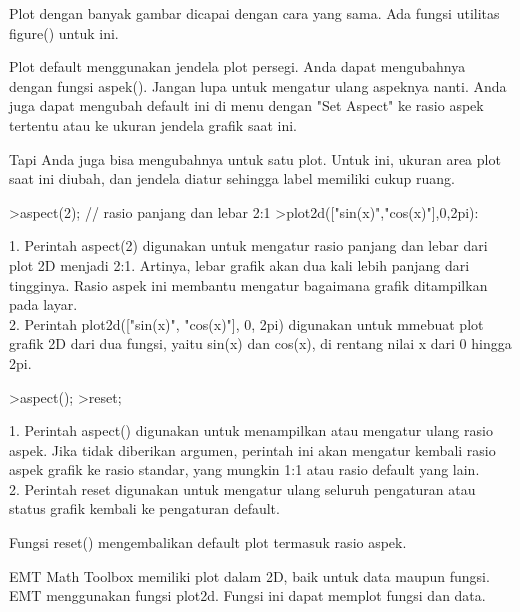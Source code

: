 \documentclass{article}
\begin{document}
\begin{eulernotebook}
\begin{eulercomment}
\begin{eulercomment}
\begin{eulercomment}
Plot dengan banyak gambar dicapai dengan cara yang sama. Ada fungsi
utilitas figure() untuk ini.

\end{eulercomment}
\begin{eulercomment}
Plot default menggunakan jendela plot persegi. Anda dapat mengubahnya
dengan fungsi aspek(). Jangan lupa untuk mengatur ulang aspeknya
nanti. Anda juga dapat mengubah default ini di menu dengan "Set
Aspect" ke rasio aspek tertentu atau ke ukuran jendela grafik saat
ini.

Tapi Anda juga bisa mengubahnya untuk satu plot. Untuk ini, ukuran
area plot saat ini diubah, dan jendela diatur sehingga label memiliki
cukup ruang.
\end{eulercomment}
\begin{eulerprompt}
>aspect(2); // rasio panjang dan lebar 2:1
>plot2d(["sin(x)","cos(x)"],0,2pi):
\end{eulerprompt}
\begin{eulercomment}
1. Perintah aspect(2) digunakan untuk mengatur rasio panjang dan lebar
dari plot 2D menjadi 2:1. Artinya, lebar grafik akan dua kali lebih
panjang dari tingginya. Rasio aspek ini membantu mengatur bagaimana
grafik ditampilkan pada layar.\\
2. Perintah plot2d(["sin(x)", "cos(x)"], 0, 2pi) digunakan untuk
mmebuat plot grafik 2D dari dua fungsi, yaitu sin(x) dan cos(x), di
rentang nilai x dari 0 hingga 2pi.
\end{eulercomment}
\begin{eulerprompt}
>aspect();
>reset;
\end{eulerprompt}
\begin{eulercomment}
1. Perintah aspect() digunakan untuk menampilkan atau mengatur ulang
rasio aspek. Jika tidak diberikan argumen, perintah ini akan mengatur
kembali rasio aspek grafik ke rasio standar, yang mungkin 1:1 atau
rasio default yang lain.\\
2. Perintah reset digunakan untuk mengatur ulang seluruh pengaturan
atau status grafik kembali ke pengaturan default.

Fungsi reset() mengembalikan default plot termasuk rasio aspek.\\
\begin{eulercomment}
\begin{eulercomment}
EMT Math Toolbox memiliki plot dalam 2D, baik untuk data maupun
fungsi. EMT menggunakan fungsi plot2d. Fungsi ini dapat memplot fungsi
dan data.


\end{eulercomment}
\end{eulercomment}
\end{eulercomment}
\end{eulercomment}
\end{eulercomment}
\end{eulernotebook}
\end{document}
